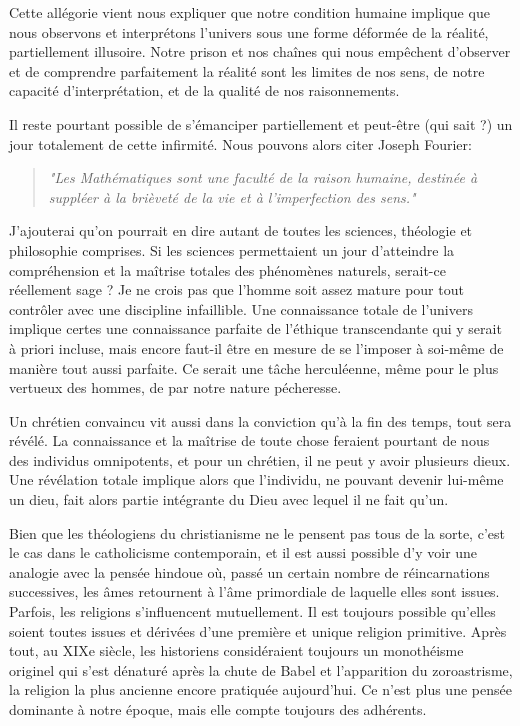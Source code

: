 Cette allégorie vient nous expliquer que notre condition humaine implique que nous observons et interprétons l’univers sous une forme déformée de la réalité, partiellement illusoire. Notre prison et nos chaînes qui nous empêchent d’observer et de comprendre parfaitement la réalité sont les limites de nos sens, de notre capacité d’interprétation, et de la qualité de nos raisonnements.

Il reste pourtant possible de s’émanciper partiellement et peut-être (qui sait ?) un jour totalement de cette infirmité. Nous pouvons alors citer Joseph Fourier:

\begin{quote}
\begin{center}
\textit{"Les Mathématiques sont une faculté de la raison humaine, destinée à suppléer à la brièveté de la vie et à l’imperfection des sens."}
\end{center}
\end{quote}

J'ajouterai qu'on pourrait en dire autant de toutes les sciences, théologie et philosophie comprises. Si les sciences permettaient un jour d’atteindre la compréhension et la maîtrise totales des phénomènes naturels, serait-ce réellement sage ? Je ne crois pas que l’homme soit assez mature pour tout contrôler avec une discipline infaillible. Une connaissance totale de l’univers implique certes une connaissance parfaite de l’éthique transcendante qui y serait à priori incluse, mais encore faut-il être en mesure de se l’imposer à soi-même de manière tout aussi parfaite. Ce serait une tâche herculéenne, même pour le plus vertueux des hommes, de par notre nature pécheresse.

Un chrétien convaincu vit aussi dans la conviction qu’à la fin des temps, tout sera révélé. La connaissance et la maîtrise de toute chose feraient pourtant de nous des individus omnipotents, et pour un chrétien, il ne peut y avoir plusieurs dieux. Une révélation totale implique alors que l’individu, ne pouvant devenir lui-même un dieu, fait alors partie intégrante du Dieu avec lequel il ne fait qu’un.

Bien que les théologiens du christianisme ne le pensent pas tous de la sorte, c'est le cas dans le catholicisme contemporain, et il est aussi possible d'y voir une analogie avec la pensée hindoue où, passé un certain nombre de réincarnations successives, les âmes retournent à l’âme primordiale de laquelle elles sont issues. Parfois, les religions s’influencent mutuellement. Il est toujours possible qu’elles soient toutes issues et dérivées d’une première et unique religion primitive. Après tout, au XIXe siècle, les historiens considéraient toujours un monothéisme originel qui s'est dénaturé après la chute de Babel et l'apparition du zoroastrisme, la religion la plus ancienne encore pratiquée aujourd'hui. Ce n'est plus une pensée dominante à notre époque, mais elle compte toujours des adhérents.

